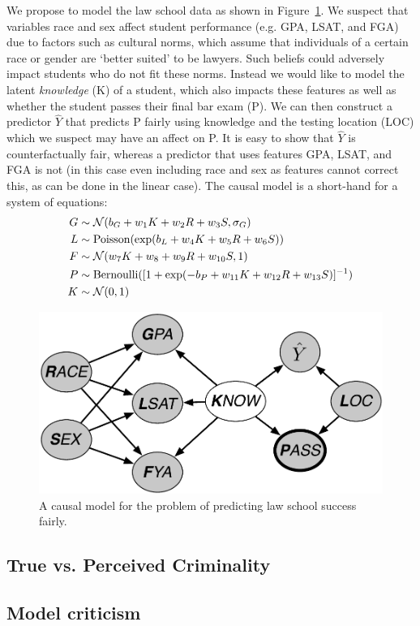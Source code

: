 We propose to model the law school data as shown in Figure~\ref{figure.law_school}. We suspect that variables race and sex affect student performance (e.g. GPA, LSAT, and FGA) due to factors such as cultural norms, which assume that individuals of a certain race or gender are `better suited' to be lawyers. Such beliefs could adversely impact students who do not fit these norms. Instead we would like to model the latent \emph{knowledge} (K) of a student, which also impacts these features as well as whether the student passes their final bar exam (P). We can then construct a predictor $\hat{Y}$ that predicts P fairly using knowledge and the testing location (LOC) which we suspect may have an affect on P. It is easy to show that $\hat{Y}$ is counterfactually fair, whereas a predictor that uses features GPA, LSAT, and FGA is not (in this case even including race and sex as features cannot correct this, as can be done in the linear case). The causal model is a short-hand for a system of equations:
\begin{align}
G &\sim {\cal N}(b_G + w_1 K + w_2 R + w_3 S, \sigma_G) \nonumber \\
L &\sim \textrm{Poisson}(\exp(b_L + w_4 K + w_5 R + w_6 S)) \nonumber \\
F &\sim {\cal N}(w_7 K + w_8 + w_9 R + w_{10} S, 1) \nonumber \\
P &\sim \textrm{Bernoulli}([1+\exp(-b_P + w_{11} K + w_{12} R + w_{13} S)]^{-1}) \nonumber \\
K &\sim {\cal N}(0,1) \nonumber
\end{align}

 


\begin{figure}[th]
\begin{center}
\vspace{-1ex}
\centerline{\includegraphics[width=\columnwidth]{law_school_model}}
\vspace{-2ex}
\caption{A causal model for the problem of predicting law school success fairly.\label{figure.law_school}}
\vspace{-2ex}
\end{center}
\end{figure}


\subsection{True vs. Perceived Criminality}

\subsection{Model criticism}